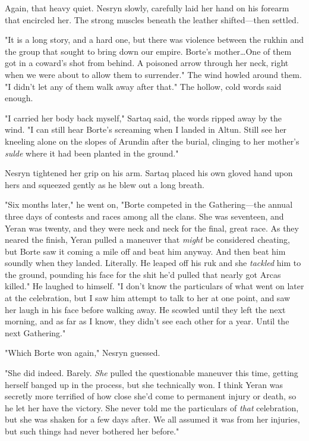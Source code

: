 Again, that heavy quiet.
Nesryn slowly, carefully laid her hand on his forearm that encircled her.
The strong muscles beneath the leather shifted---then settled.

"It is a long story, and a hard one, but there was violence between the rukhin and the group that sought to bring down our empire.
Borte's mother\ldots One of them got in a coward's shot from behind.
A poisoned arrow through her neck, right when we were about to allow them to surrender."
The wind howled around them.
"I didn't let any of them walk away after that."
The hollow, cold words said enough.

"I carried her body back myself," Sartaq said, the words ripped away by the wind.
"I can still hear Borte's screaming when I landed in Altun.
Still see her kneeling alone on the slopes of Arundin after the burial, clinging to her mother's \emph{sulde} where it had been planted in the ground."

Nesryn tightened her grip on his arm.
Sartaq placed his own gloved hand upon hers and squeezed gently as he blew out a long breath.

"Six months later," he went on, "Borte competed in the Gathering---the annual three days of contests and races among all the clans.
She was seventeen, and Yeran was twenty, and they were neck and neck for the final, great race.
As they neared the finish, Yeran pulled a maneuver that \emph{might} be considered cheating, but Borte saw it coming a mile off and beat him anyway.
And then beat him soundly when they landed.
Literally.
He leaped off his ruk and she \emph{tackled} him to the ground, pounding his face for the shit he'd pulled that nearly got Arcas killed."
He laughed to himself.
"I don't know the particulars of what went on later at the celebration, but I saw him attempt to talk to her at one point, and saw her laugh in his face before walking away.
He scowled until they left the next morning, and as far as I know, they didn't see each other for a year.
Until the next Gathering."

"Which Borte won again," Nesryn guessed.

"She did indeed.
Barely.
\emph{She} pulled the questionable maneuver this time, getting herself banged up in the process, but she technically won.
I think Yeran was secretly more terrified of how close she'd come to permanent injury or death, so he let her have the victory.
She never told me the particulars of \emph{that} celebration, but she was shaken for a few days after.
We all assumed it was from her injuries, but such things had never bothered her before."

